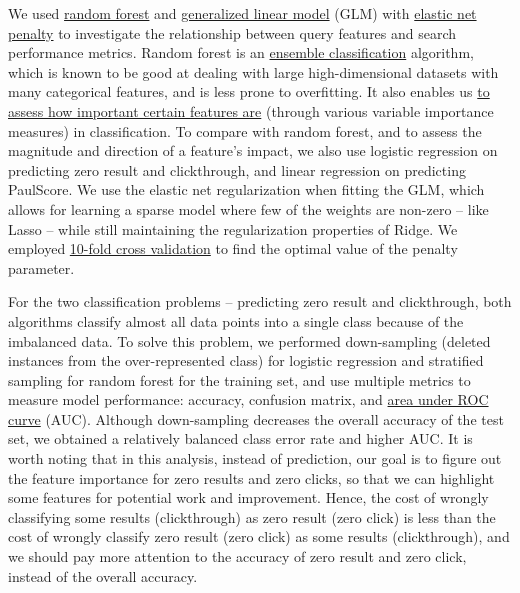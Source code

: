 \documentclass[12pt,]{article}
\begin{document}
We used \href{https://en.wikipedia.org/wiki/Random_forest}{random
forest} and
\href{https://en.wikipedia.org/wiki/Generalized_linear_model}{generalized
linear model} (GLM) with
\href{https://en.wikipedia.org/wiki/Elastic_net_regularization}{elastic
net penalty} to investigate the relationship between query features and
search performance metrics. Random forest is an
\href{https://en.wikipedia.org/wiki/Ensemble_learning}{ensemble
classification} algorithm, which is known to be good at dealing with
large high-dimensional datasets with many categorical features, and is
less prone to overfitting. It also enables us
\href{https://en.wikipedia.org/wiki/Random_forest\#Variable_importance}{to
assess how important certain features are} (through various variable
importance measures) in classification. To compare with random forest,
and to assess the magnitude and direction of a feature's impact, we also
use logistic regression on predicting zero result and clickthrough, and
linear regression on predicting PaulScore. We use the elastic net
regularization when fitting the GLM, which allows for learning a sparse
model where few of the weights are non-zero -- like Lasso -- while still
maintaining the regularization properties of Ridge. We employed
\href{https://en.wikipedia.org/wiki/Cross-validation_(statistics)\#k-fold_cross-validation}{10-fold
cross validation} to find the optimal value of the penalty parameter.

For the two classification problems -- predicting zero result and
clickthrough, both algorithms classify almost all data points into a
single class because of the imbalanced data. To solve this problem, we
performed down-sampling (deleted instances from the over-represented
class) for logistic regression and stratified sampling for random forest
for the training set, and use multiple metrics to measure model
performance: accuracy, confusion matrix, and
\href{https://en.wikipedia.org/wiki/Receiver_operating_characteristic\#Area_under_the_curve}{area
under ROC curve} (AUC). Although down-sampling decreases the overall
accuracy of the test set, we obtained a relatively balanced class error
rate and higher AUC. It is worth noting that in this analysis, instead
of prediction, our goal is to figure out the feature importance for zero
results and zero clicks, so that we can highlight some features for
potential work and improvement. Hence, the cost of wrongly classifying
some results (clickthrough) as zero result (zero click) is less than the
cost of wrongly classify zero result (zero click) as some results
(clickthrough), and we should pay more attention to the accuracy of zero
result and zero click, instead of the overall accuracy.
\end{document}
